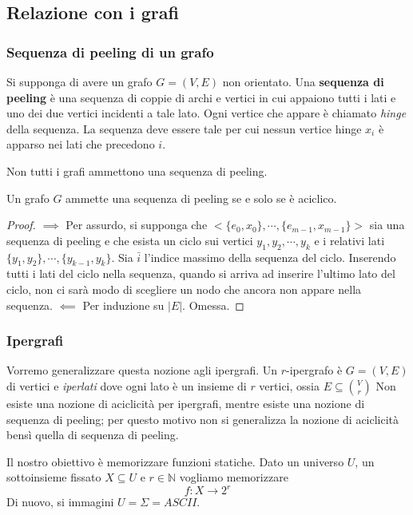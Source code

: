 \subsection{Relazione con i grafi}
\subsubsection{Sequenza di peeling di un grafo}
Si supponga di avere un grafo $G = (V,E)$ non orientato. Una \textbf{sequenza di peeling} è
una sequenza di coppie di archi e vertici in cui appaiono tutti i lati e uno dei due vertici incidenti
a tale lato. Ogni vertice che appare è chiamato \textit{hinge} della sequenza. La sequenza deve essere tale
per cui nessun vertice hinge $x_i$ è apparso nei lati che precedono $i$.

Non tutti i grafi ammettono una sequenza di peeling.
\begin{theorem}
	Un grafo $G$ ammette una sequenza di peeling se e solo se è aciclico.
\end{theorem}
\begin{proof}
	$\implies$ Per assurdo, si supponga che $<\{e_0, x_0\}, \cdots, \{e_{m-1}, x_{m-1}\}>$ sia una sequenza
	di peeling e che esista un ciclo sui vertici $y_1, y_2, \cdots, y_k$ e i relativi lati
	$\{y_1, y_2\}, \cdots, \{y_{k-1}, y_k\}$. Sia $\bar{i}$ l'indice massimo della sequenza del ciclo.
	Inserendo tutti i lati del ciclo nella sequenza, quando si arriva ad inserire l'ultimo lato del ciclo,
	non ci sarà modo di scegliere un nodo che ancora non appare nella sequenza.
	$\impliedby$ Per induzione su $|E|$. Omessa. %
\end{proof}



\subsubsection{Ipergrafi}
Vorremo generalizzare questa nozione agli ipergrafi. Un $r$-ipergrafo è $G = (V, E)$ di vertici
e \textit{iperlati} dove ogni lato è un insieme di $r$ vertici, ossia $E \subseteq {V \choose r}$
Non esiste una nozione di aciclicità per ipergrafi, mentre esiste una nozione di sequenza di peeling;
per questo motivo non si generalizza la nozione di aciclicità bensì quella di sequenza di peeling.

Il nostro obiettivo è memorizzare funzioni statiche. Dato un universo $U$, un sottoinsieme fissato
$X \subseteq U$ e $r \in \mathbb{N}$ vogliamo memorizzare
$$
	f: X \rightarrow 2^r
$$
Di nuovo, si immagini $U = \Sigma = ASCII$.
%
%

